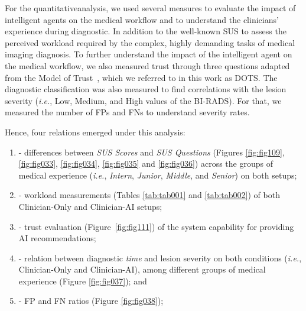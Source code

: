 For the quantitative\footnotemark[13] analysis, we used several measures to evaluate the impact of intelligent agents on the medical workflow and to understand the clinicians' experience during diagnostic.
In addition to the well-known \ac{SUS} to assess the perceived workload required by the complex, highly demanding tasks of medical imaging diagnosis.
To further understand the impact of the intelligent agent on the medical workflow, we also measured trust through three questions adapted from the Model of Trust~\cite{CALISTO2021102607}, which we referred to in this work as \ac{DOTS}.
The diagnostic classification was also measured to find correlations with the lesion severity ({\it i.e.}, Low, Medium, and High values of the BI-RADS).
For that, we measured the number of \acp{FP} and \acp{FN} to understand severity rates.


\vspace{1.5mm}

\noindent
Hence, four relations emerged under this analysis:

\vspace{0.5mm}

\begin{enumerate}[label=\alph*]
\item - differences between {\it \ac{SUS} Scores} and {\it \ac{SUS} Questions} (Figures \ref{fig:fig109}, \ref{fig:fig033}, \ref{fig:fig034}, \ref{fig:fig035} and \ref{fig:fig036}) across the groups of medical experience ({\it i.e.}, {\it Intern}, {\it Junior}, {\it Middle}, and {\it Senior}) on both setups;
\item - workload measurements (Tables \ref{tab:tab001} and \ref{tab:tab002}) of both Clinician-Only and Clinician-AI setups;
\item - trust evaluation (Figure~\ref{fig:fig111}) of the system capability for providing \ac{AI} recommendations;
\item - relation between diagnostic {\it time} and lesion severity on both conditions ({\it i.e.}, Clinician-Only and Clinician-AI), among different groups of medical experience (Figure \ref{fig:fig037}); and
\item - \acf{FP} and \acf{FN} ratios (Figure \ref{fig:fig038});
\end{enumerate}

